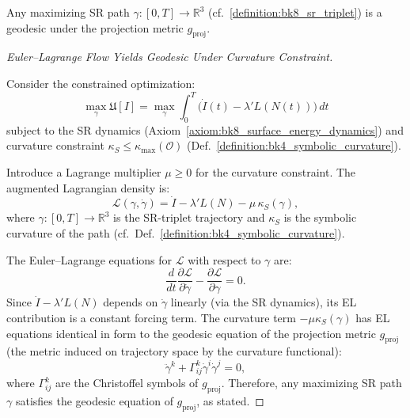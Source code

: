 \begin{corollary}
\label{corollary:bk8_sr_path_maximization}
Any maximizing SR path \( \gamma: [0,T] \to \mathbb{R}^3 \) (cf.~\ref{definition:bk8_sr_triplet}) is a geodesic under the projection metric \( g_{\mathrm{proj}} \).
\end{corollary}
\begin{proof}[Euler--Lagrange Flow Yields Geodesic Under Curvature Constraint]
\label{proof:bk8_skech_via_euler_lagrange_flow_yields_geodesic}
\leavevmode

Consider the constrained optimization:
\[
\max_{\gamma} \mathfrak{U}[I]
= \max_{\gamma}\int_0^T \bigl(\dot{I}(t) - \lambda' L(N(t))\bigr)\,dt
\]
subject to the SR dynamics (Axiom~\ref{axiom:bk8_surface_energy_dynamics}) and curvature
constraint $\kappa_S \leq \kappa_{\max}(\mathcal{O})$
(Def.~\ref{definition:bk4_symbolic_curvature}).

Introduce a Lagrange multiplier $\mu \geq 0$ for the curvature constraint. The augmented
Lagrangian density is:
\[
\mathcal{L}(\gamma, \dot\gamma) = \dot{I} - \lambda' L(N) - \mu\,\kappa_S(\gamma),
\]
where $\gamma: [0,T] \to \mathbb{R}^3$ is the SR-triplet trajectory and $\kappa_S$ is the
symbolic curvature of the path (cf.~Def.~\ref{definition:bk4_symbolic_curvature}).

The Euler--Lagrange equations for $\mathcal{L}$ with respect to $\gamma$ are:
\[
\frac{d}{dt}\frac{\partial\mathcal{L}}{\partial\dot\gamma}
- \frac{\partial\mathcal{L}}{\partial\gamma} = 0.
\]
Since $\dot{I} - \lambda'L(N)$ depends on $\dot\gamma$ linearly (via the SR dynamics),
its EL contribution is a constant forcing term. The curvature term $-\mu\kappa_S(\gamma)$
has EL equations identical in form to the geodesic equation of the projection metric
$g_{\mathrm{proj}}$ (the metric induced on trajectory space by the curvature functional):
\[
\ddot\gamma^k + \Gamma^k_{ij}\dot\gamma^i\dot\gamma^j = 0,
\]
where $\Gamma^k_{ij}$ are the Christoffel symbols of $g_{\mathrm{proj}}$. Therefore,
any maximizing SR path $\gamma$ satisfies the geodesic equation of $g_{\mathrm{proj}}$,
as stated.
\end{proof}
